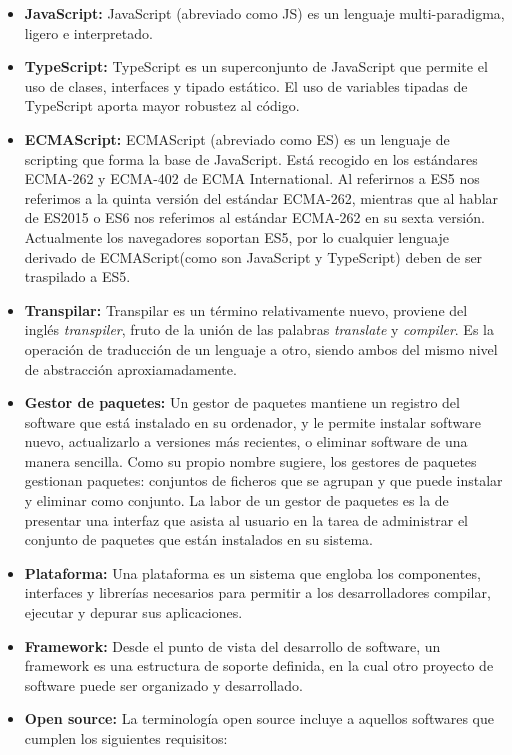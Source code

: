 \documentclass[openright,twoside,10pt]{book}
\begin{document}
    \begin{itemize}
    \item
      \textbf{JavaScript:} \cite{mozilla_javascript} JavaScript (abreviado
      como JS) es un lenguaje multi-paradigma, ligero e interpretado.
    \item
      \textbf{TypeScript:} \cite{enriqueoriol2017, stackoverflow_Typescript}
      TypeScript es un superconjunto de JavaScript que permite el uso de
      clases, interfaces y tipado estático. El uso de variables tipadas de
      TypeScript aporta mayor robustez al código.
    \item
      \textbf{ECMAScript:} \cite{mozilla_ecmascript} ECMAScript (abreviado
      como ES) es un lenguaje de scripting que forma la base de JavaScript.
      Está recogido en los estándares ECMA-262 y ECMA-402 de ECMA
      International. Al referirnos a ES5 nos referimos a la quinta versión
      del estándar ECMA-262, mientras que al hablar de ES2015 o ES6 nos
      referimos al estándar ECMA-262 en su sexta versión. Actualmente los
      navegadores soportan ES5, por lo cualquier lenguaje derivado de
      ECMAScript(como son JavaScript y TypeScript) deben de ser traspilado a
      ES5.
    \item
      \textbf{Transpilar:}
      \cite{enriquefernandezguerra_typescript, builtbyedgar_transpilar}
      Transpilar es un término relativamente nuevo, proviene del inglés
      \emph{transpiler}, fruto de la unión de las palabras \emph{translate}
      y \emph{compiler}. Es la operación de traducción de un lenguaje a
      otro, siendo ambos del mismo nivel de abstracción aproxiamadamente.
    \item
      \textbf{Gestor de paquetes:} \cite{debian_gestorpaquetes} Un gestor de
      paquetes mantiene un registro del software que está instalado en su
      ordenador, y le permite instalar software nuevo, actualizarlo a
      versiones más recientes, o eliminar software de una manera sencilla.
      Como su propio nombre sugiere, los gestores de paquetes gestionan
      paquetes: conjuntos de ficheros que se agrupan y que puede instalar y
      eliminar como conjunto. La labor de un gestor de paquetes es la de
      presentar una interfaz que asista al usuario en la tarea de
      administrar el conjunto de paquetes que están instalados en su
      sistema.
    \item
      \textbf{Plataforma:} Una plataforma es un sistema que engloba los
      componentes, interfaces y librerías necesarios para permitir a los
      desarrolladores compilar, ejecutar y depurar sus aplicaciones.
    \item
      \textbf{Framework:} Desde el punto de vista del desarrollo de
      software, un framework es una estructura de soporte definida, en la
      cual otro proyecto de software puede ser organizado y desarrollado.
    \item
      \textbf{Open source:} \cite{opensource_definition} La terminología
      open source incluye a aquellos softwares que cumplen los siguientes
      requisitos:
    

\end{itemize}
\end{document}
